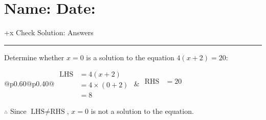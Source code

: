 \documentclass[12pt]{article}
\def \HeadingAnswers {\section*{\Large Name: \underline{\hspace{8cm}} \hfill Date: \underline{\hspace{3cm}}} \vspace{-3mm}
{+x Check Solution: Answers} \vspace{1pt}\hrule}
\newcounter{minipagecount}
\begin{document}
\HeadingAnswers
\vspace{1pt}
\begin{multicols}{2}
\noindent{(\theminipagecount)}\hspace{0.1mm} %
\begin{minipage}[t]{0.40\textwidth} %

    \noindent Determine whether \(x = 0\) is a solution to the equation \(4(x + 2) = 20\):
    \vspace{4pt}  %

    \noindent

    \renewcommand{\arraystretch}{1.3} %
    \begin{tabular}{@{}p{0.60\linewidth}@{}p{0.40\linewidth}@{}}
        \(\begin{aligned}
            \text{LHS} &= 4(x + 2) \\
                    &= 4 \times(0 + 2) \\
                    &= 8
        \end{aligned}\) &
        \(\begin{aligned}
            \text{RHS} &= 20\\
                    & \\
                    &
        \end{aligned}\)
    \end{tabular}
    \renewcommand{\arraystretch}{1.0} %
    \vspace{2pt}  %

    \noindent \(\therefore\) Since \(\text{LHS} \neq \text{RHS}\), \(x = 0\) is not  a solution to the equation.

\end{minipage}

 \vspace*{16pt}
\noindent{(\theminipagecount)}\hspace{0.1mm} %
\begin{minipage}[t]{0.40\textwidth} %


\end{minipage}
\end{multicols}
\end{document}
